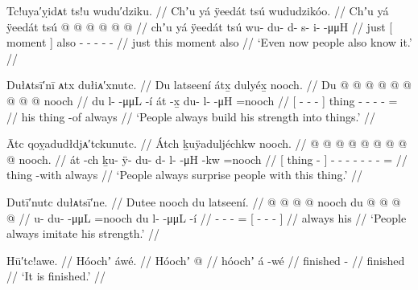 \ex\label{ex:93-70-even-now-people-know-it}%
%
\begingl
	\glpreamble	Tc!uya′ỵidᴀt ts!u wudu′dziku. //
	\glpreamble	Chʼu yá ÿeedát tsú wududzikóo. //
	\gla	Chʼu {} yá ÿeedát {} tsú
		 @ {} @ {} @ {} @ {} @ {} @ {} //
	\glb	chʼu {} yá ÿeedát {} tsú
		wu- du- d- s- i-  -μμH //
	\glc	just {}[  moment {}] also
		- - - -  - //
	\gld	just {} this moment {} also
		 {} {} {} {} {} {} //
	\glft	‘Even now people also know it.’
		//
\endgl
\xe

\ex\label{ex:93-71-make-his-strength-things}%
%
\begingl
	\glpreamble	Dułᴀtsī′nī ᴀtx dułiᴀ′xnutc. //
	\glpreamble	Du latseení átx̱ dulyéx̱ nooch. //
	\gla	{} Du  @ {} @ {} @ {} @ {} {}
		{}  @ {} {}
		 @ {} @ {} @ {} @ \•nooch //
	\glb	{} du l-  -μμL {} -í {}
		{} át -x̱ {}
		du- l-  -μH =nooch //
	\glc	{}[  -  - \· - {}]
		{} thing - {}
		- -  - = //
	\gld	{} his  {} {} {} {} {}
		{} thing -of {}
		 {} {} {} \•always //
	\glft	‘People always build his strength into things.’
		//
\endgl
\xe

\ex\label{ex:93-72-make-his-strength-things}%
%
\begingl
	\glpreamble	Ātc qoỵadudłdjᴀ′tckunutc. //
	\glpreamble	Átch ḵuÿaduljéchkw nooch. //
	\gla	{}  @ {} {}
		 @ {} @ {} @ {} @ {} @ {} @ {} @ {} @ \•nooch. //
	\glb	{} át -ch {}
		ḵu- ÿ- du- d- l-  -μH -kw =nooch //
	\glc	{}[ thing - {}]
		- - - - -  - - = //
	\gld	{} thing -with {}
		 {} {} {} {} {} {} {} \•always //
	\glft	‘People always surprise people with this thing.’
		//
\endgl
\xe

\ex\label{ex:93-73-imitate-his-strength}%
%
\begingl
	\glpreamble	Dutī′nutc dułᴀtsī′ne. //
	\glpreamble	Dutee nooch du latseení. //
	\gla	{} @ {} @ {} @ {} @ \•nooch
		{} du  @ {} @ {} @ {} @ {} {} //
	\glb	u- du-  -μμL =nooch
		{} du l-  -μμL {} -í {}  //
	\glc	{}- -  - =
			{}[  -  - \· - {}] //
	\gld	{} {} {} {} \•always
		{} his  {} {} {} {} {} //
	\glft	‘People always imitate his strength.’
		//
\endgl
\xe

\ex\label{ex:93-74-thats-it}%
%
\begingl
	\glpreamble	Hū′tc!awe. //
	\glpreamble	Hóochʼ áwé. //
	\gla	Hóochʼ  @ {} //
	\glb	hóochʼ á -wé //
	\glc	finished  - //
	\gld	finished  {} //
	\glft	‘It is finished.’
		//
\endgl
\xe
